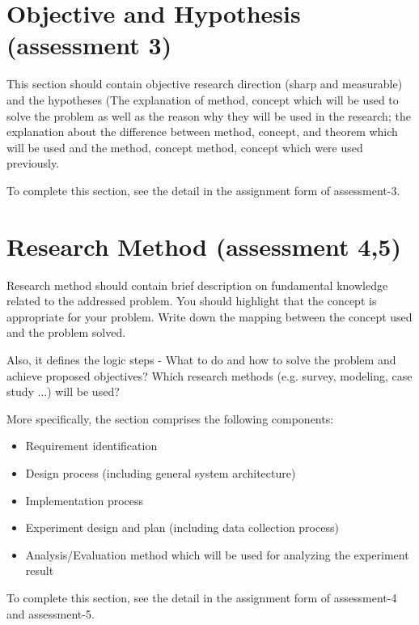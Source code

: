 \documentclass{ittelkom}
\begin{document}
\section{Objective and Hypothesis \color{red}(assessment 3)} \label{hyp}
This section should contain objective research direction (sharp and measurable) and the hypotheses (The explanation of method, concept which will be used to solve the problem as well as the reason why they will be used in the research; the explanation about the difference between method, concept, and theorem which will be used and the method, concept method, concept which were used previously.

To complete this section, see the detail in the assignment form of assessment-3. 



\section{Research Method \color{red}(assessment 4,5)}
Research method should contain brief description on fundamental knowledge related to the addressed problem. You should highlight that the concept is appropriate for your problem. Write down the mapping between the concept used and the problem solved.

Also, it defines the logic steps - What to do and how to solve the problem and achieve proposed objectives? Which research methods (e.g. survey, modeling, case study ...) will be used? 

More specifically, the section comprises the following components:
\begin{itemize}
\item[1.] Requirement identification
\item[2.] Design process (including general system architecture)
\item[3.] Implementation process
\item[4.] Experiment design and plan (including data collection process)
\item[5.] Analysis/Evaluation method which will be used for analyzing the experiment result
\end{itemize}

To complete this section, see the detail in the assignment form of assessment-4 and assessment-5.
\end{document}

